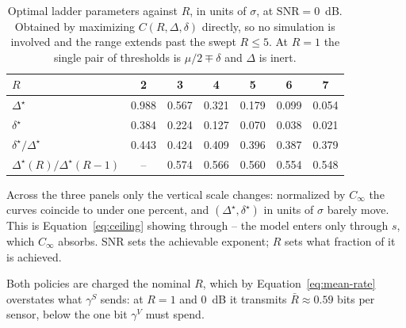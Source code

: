 \documentclass[11pt]{article}
\begin{document}
\begin{table}[h!]
\centering
\begin{tabular}{l|cccccc}
\hline
$R$ & 2 & 3 & 4 & 5 & 6 & 7 \\
\hline
$\Delta^\star$ & 0.988 & 0.567 & 0.321 & 0.179 & 0.099 & 0.054 \\
$\delta^\star$ & 0.384 & 0.224 & 0.127 & 0.070 & 0.038 & 0.021 \\
$\delta^\star/\Delta^\star$ & 0.443 & 0.424 & 0.409 & 0.396 & 0.387 & 0.379 \\
$\Delta^\star(R)/\Delta^\star(R-1)$ & -- & 0.574 & 0.566 & 0.560 & 0.554 & 0.548 \\
\hline
\end{tabular}
\caption{Optimal ladder parameters against $R$, in units of $\sigma$, at
$\mathrm{SNR} = 0$~dB. Obtained by maximizing $C(R,\Delta,\delta)$
directly, so no simulation is involved and the range extends past the
swept $R \le 5$. At $R = 1$ the single pair of thresholds is
$\mu/2 \mp \delta$ and $\Delta$ is inert.}
\label{tab:opt-params}
\end{table}

Across the three panels only the vertical scale changes: normalized by
$C_\infty$ the curves coincide to under one percent, and
$(\Delta^\star,\delta^\star)$ in units of $\sigma$ barely move. This is
Equation~\eqref{eq:ceiling} showing through -- the model enters only
through $s$, which $C_\infty$ absorbs. SNR sets the achievable exponent;
$R$ sets what fraction of it is achieved.

Both policies are charged the nominal $R$, which by
Equation~\eqref{eq:mean-rate} overstates what $\gamma^S$ sends: at $R = 1$
and $0$~dB it transmits $\bar R \approx 0.59$ bits per sensor, below the
one bit $\gamma^V$ must spend.
\end{document}
